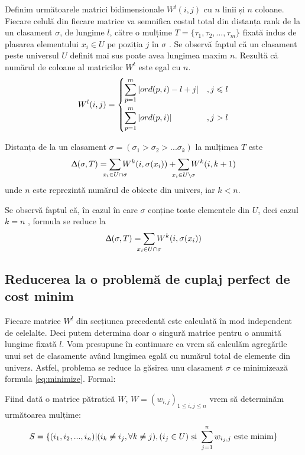 Definim următoarele matrici bidimensionale $W^l(i, j)$ cu $n$ linii și $n$ coloane. Fiecare celulă
din fiecare matrice va semnifica costul total din distanța rank de la un clasament $\sigma$, de 
lungime $l$, către o mulțime $T = \{\tau_1, \tau_2, ..., \tau_m\}$ fixată indus de plasarea 
elementului $x_i \in U$ pe poziția $j$ în $\sigma$ \cite{rankaggregationproblem}. Se observă faptul
că un clasament peste universul $U$ definit mai sus poate avea lungimea maxim $n$. Rezultă că 
numărul de coloane al matricilor $W^t$ este egal cu $n$.
\[
  W^l(i, j) = \begin{dcases}
    \smashoperator{\sum_{p=1}^{m}} | ord(p, i) - l + j |    &, j \leqslant l \\
    \smashoperator{\sum_{p=1}^{m}} | ord(p, i) |            &, j > l
  \end{dcases}
\]

\begin{remark}
Distanța de la un clasament $\sigma=(\sigma_1 > \sigma_2 > ... \sigma_k)$ la mulțimea $T$ este
\[
  \Updelta(\sigma, T) = \smashoperator{\sum_{x_i \in U \cap \sigma}} W^k(i, \sigma(x_i)) +
      \smashoperator{\sum_{x_i \in U \setminus \sigma}} W^k(i, k + 1)
\]unde $n$ este reprezintă numărul de obiecte din univers, iar $k < n$.
\end{remark}
Se observă faptul că, în cazul în care $\sigma$ conține toate elementele din $U$, deci cazul $k = n$
, formula se reduce la 
\begin{gather}
  \label{eq:minimize}
  \Updelta(\sigma, T) = \smashoperator{\sum_{x_i \in U \cap \sigma}} W^k(i, \sigma(x_i))
\end{gather}


\subsection{Reducerea la o problemă de cuplaj perfect de cost minim}
Fiecare matrice $W^l$ din secțiunea precedentă este calculată în mod independent de celelalte.
Deci putem determina doar o singură matrice pentru o anumită lungime fixată $l$. Vom presupune
în continuare ca vrem să calculăm agregările unui set de clasamente având lungimea egală cu numărul
total de elemente din univers. Astfel, problema se reduce la găsirea unu clasament $\sigma$ ce 
minimizează formula \eqref{eq:minimize}. Formal:

\begin{problem}
Fiind dată o matrice pătratică $W$, $W = (w_{i, j})_{1 \leqslant i,j \leqslant n}$ vrem să
determinăm următoarea mulțime:
\[
  S = \{(i_1, i_2, ..., i_n) | (i_k \neq i_j, \forall k \neq j), (i_j \in U) \text{ și } \smashoperator{\sum_{j=1}^n} w_{i_j, j} \text{ este minim}\}
\]
\end{problem}

